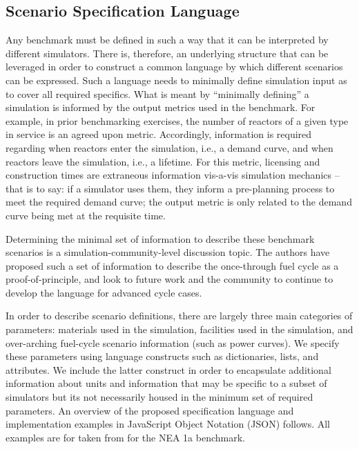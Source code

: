 \documentclass{anstrans}
\begin{document}
\subsection{Scenario Specification Language}
Any benchmark must be defined in such a way that it can be interpreted by
different simulators. There is, therefore, an underlying structure that can be
leveraged in order to construct a common language by which different scenarios
can be expressed. Such a language needs to minimally define simulation input as
to cover all required specifics. What is meant by ``minimally defining'' a
simulation is informed by the output metrics used in the benchmark. For example,
in prior benchmarking exercises, the number of reactors of a given type in
service is an agreed upon metric. Accordingly, information is required regarding
when reactors enter the simulation, i.e., a demand curve, and when reactors leave
the simulation, i.e., a lifetime. For this metric, licensing and construction
times are extraneous information vis-a-vis simulation mechanics -- that is to
say: if a simulator uses them, they inform a pre-planning process to meet the
required demand curve; the output metric is only related to the demand curve
being met at the requisite time.

Determining the minimal set of information to describe these benchmark scenarios
is a simulation-community-level discussion topic. The authors have proposed such
a set of information to describe the once-through fuel cycle as a
proof-of-principle, and look to future work and the community to continue to
develop the language for advanced cycle cases. 

In order to describe scenario definitions, there are largely three main
categories of parameters: materials used in the simulation, facilities used in
the simulation, and over-arching fuel-cycle scenario information (such as power
curves). We specify these parameters using language constructs such as
dictionaries, lists, and attributes. We include the latter construct in order to
encapsulate additional information about units and information that may be
specific to a subset of simulators but its not necessarily housed in the minimum
set of required parameters. An overview of the proposed specification
language and implementation examples in JavaScript Object Notation
(JSON)\cite{_json_2001} follows. All examples are for taken from for the NEA 1a
benchmark\cite{boucher_specification_2008}.
\end{document}
